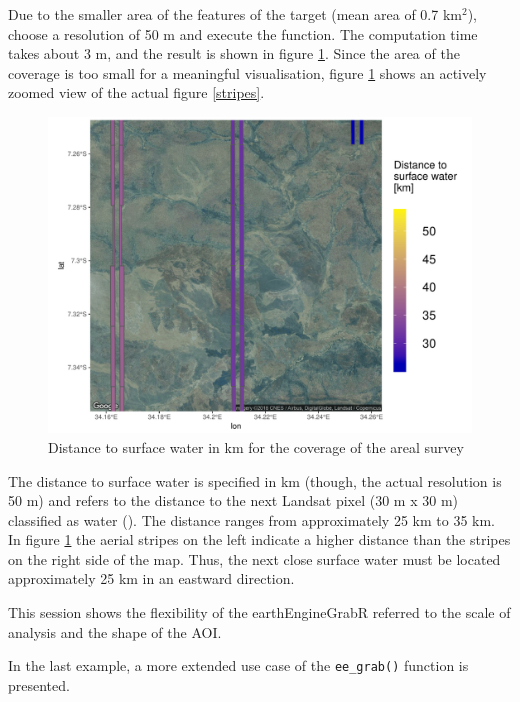 Due to the smaller area of the features of the target (mean area of 0.7 km$^2$), choose a resolution of 50 m and execute the function. The computation time takes about 3 m, and the result is shown in figure \ref{session_2}. Since the area of the coverage is too small for a meaningful visualisation, figure \ref{session_2} shows an actively zoomed view of the actual figure \ref{stripes}. 

\begin{center}
	\begin{figure}[h]
		\begin{center}
			\includegraphics[width=15cm]{images/stripes_distance_2.pdf}
			\caption{Distance to surface water in km for the coverage of the areal survey}
			\label{session_2}
		\end{center}
	\end{figure}
\end{center}

The distance to surface water is specified in km (though, the actual resolution is 50 m) and refers to the distance to the next Landsat pixel (30 m x 30 m) classified as water (\cite{pekel2016high}). The distance ranges from approximately 25 km to 35 km. In figure \ref{session_2} the aerial stripes on the left indicate a higher distance than the stripes on the right side of the map. Thus, the next close surface water must be located approximately 25 km in an eastward direction. 

This session shows the flexibility of the earthEngineGrabR referred to the scale of analysis and the shape of the AOI.

In the last example, a more extended use case of the \texttt{ee\_grab()} function is presented.

